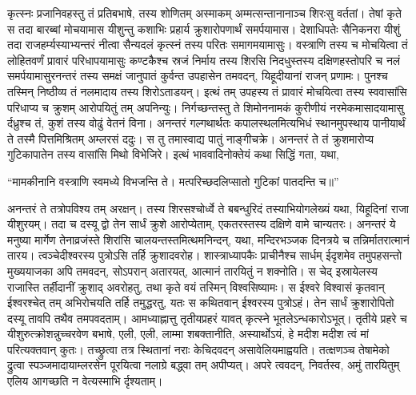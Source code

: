 \vakya कृत्स्नः प्रजानिवहस्तु तं प्रतिबभाषे, तस्य शोणितम् अस्माकम् अम्मत्सन्तानानाञ्च शिरःसु वर्ततां।
\vakya तेषां कृते स तदा बारब्बां मोचयामास यीशुन्तु कशाभिः प्रहार्य क्रुशारोपणार्थं समर्पयामास।
\vakya देशाधिपतेः सैनिकनरा यीशुं तदा राजहर्म्यस्याभ्यन्तरं नीत्वा सैन्यदलं कृत्स्नं तस्य परितः समागमयामासुः।
\vakya वस्त्राणि तस्य च मोचयित्वा तं लोहितवर्णं प्रावारं परिधापयामासुः
\vakya कण्टकैश्च स्रजं निर्माय तस्य शिरसि निदधुस्तस्य दक्षिणहस्तोपरि च नलं समर्पयामासुरनन्तरं तस्य समक्षं जानुपातं कुर्वन्त उपहासेन तमवदन्, यिहूदीयानां राजन् प्रणामः।
\vakya पुनश्च तस्मिन् निष्ठीव्य तं नलमादाय तस्य शिरोऽताडयन्।
\vakya इत्थं तम् उपहस्य तं प्रावारं मोचयित्वा तस्य स्ववासांसि परिधाप्य च क्रुशम् आरोपयितुं तम् अपनिन्युः।
\vakya निर्गच्छन्तस्तु ते शिमोननामकं कुरीणीयं नरमेकमासादयामासु र्दध्रुश्च तं, कुशं तस्य वोढुं वेतनं विना।
\vakya अनन्तरं गल्गथार्थतः कपालस्थलमित्यभिधं स्थानमुपस्थाय पानीयार्थं ते तस्मै पित्तमिश्रितम् अम्लरसं ददुः।
\vakya स तु तमास्वाद्य पातुं नाङ्गीचक्रे।
\vakya अनन्तरं ते तं क्रुशमारोप्य गुटिकापातेन तस्य वासांसि मिथो विभेजिरे। इत्थं भाववादिनोक्तेयं कथा सिद्धिं गता, यथा,
\begin{poem}
\startwithline “मामकीनानि वस्त्राणि स्वमध्ये विभजन्ति ते।
\pline मत्परिच्छदलिप्सातो गुटिकां पातदन्ति च॥”
\end{poem}
\vakya अनन्तरं ते तत्रोपविश्य तम् अरक्षन्।
\vakya तस्य शिरसश्चोर्ध्वे ते बबन्धुरिदं तस्याभियोगलेख्यं यथा, यिहूदिनां राजा यीशुरयम्।
\vakya तदा च दस्यू द्वो तेन सार्धं क्रुशे आरोप्येताम्, एकतरस्तस्य दक्षिणे वामे चान्यतरः।
\vakya अनन्तरं ये मनुष्या मार्गेण तेनाव्रजंस्ते शिरांसि चालयन्तस्तमित्थमनिन्दन्, यथा,
\vakya मन्दिरभञ्जक दिनत्रये च तन्निर्मातरात्मानं तारय। त्वञ्चेदीश्वरस्य पुत्रोऽसि तर्हि क्रुशादवरोह।
\vakya शास्त्राध्यापकैः प्राचीनैश्च सार्धम् ईदृशमेव तमुपहसन्तो मुख्ययाजका अपि तमवदन्, सोऽपरान् अतारयत्, आत्मानं तारयितुं न शक्नोति।
\vakya स चेद् इस्रायेलस्य राजास्ति तर्हीदानीं क्रुशाद् अवरोहतु, तथा कृते वयं तस्मिन् विश्वसिष्यामः।
\vakya स ईश्वरे विश्वासं कृतवान् ईश्वरश्चेत् तम् अभिरोचयति तर्हि तमुद्धरतु, यतः स कथितवान् ईश्वरस्य पुत्रोऽहं।
\vakya तेन सार्धं क्रुशारोपितो दस्यू तावपि तथैव तमपवदताम्।
\vakya आमध्याह्नात्तु तृतीयप्रहरं यावत् कृत्स्ने भूतलेऽन्धकारोऽभूत्।
\vakya तृतीये प्रहरे च यीशुरुत्क्रोशन्नुच्चरवेण बभाषे, एली, एली, लाम्मा शबक्तानीति, अस्यार्थोऽयं, हे मदीश मदीश त्वं मां परित्यक्तवान् कुतः।
\vakya तच्छ्रुत्वा तत्र स्थितानां नराः केचिदवदन् असावेलियमाह्वयति।
\vakya तत्क्षणञ्च तेषामेको द्रुत्वा स्पञ्जमादायाम्लरसेन पूरयित्वा नलाग्रे बद्ध्वा तम् अपीप्यत्।
\vakya अपरे त्ववदन्, निवर्तस्व, अमुं तारयितुम् एलिय आगच्छति न वेत्यस्माभि र्दृश्यताम्।
